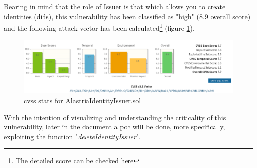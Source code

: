 Bearing in mind that the role of Issuer is that which allows you to create identities (\acrshort{did}s), this vulnerability has been classified as "high" (8.9 overall score) and the following attack vector has been calculated\footnote{The detailed score can be checked \href{https://nvd.nist.gov/vuln-metrics/cvss/v3-calculator?vector=AV:N/AC:L/PR:H/UI:N/S:C/C:N/I:H/A:H/E:F/RL:O/RC:R/CR:X/IR:H/AR:H/MAV:N/MAC:L/MPR:N/MUI:N/MS:C/MC:X/MI:H/MA:H&version=3.1}{here}} (figure \ref{fig:stats-aii}).\\
\begin{figure}[h]
    \centering
    \includegraphics[width=1.1\textwidth]{images/Security Audit/stats-aii.png}
    \caption{\acrshort{cvss} stats for AlastriaIdentityIssuer.sol}
    \label{fig:stats-aii}
\end{figure}

With the intention of visualizing and understanding the criticality of this vulnerability, later in the document a \acrfull{poc} will be done, more specifically, exploiting the function "\textit{deleteIdentityIssuer}".\\

